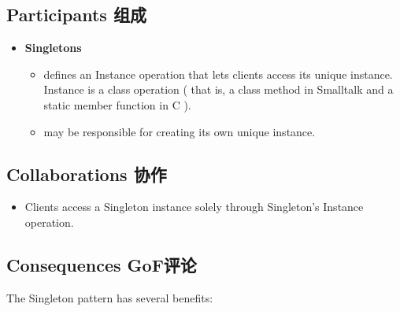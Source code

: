 
\subsection{Participants 组成}

\begin{itemize}
\small
	\item \textbf{Singletons}
	\begin{itemize}
	
		\item defines an Instance operation that lets clients access its unique instance. Instance is a class operation ( that is, a class method in Smalltalk and a static member function in C ).

		\item may be responsible for creating its own unique instance.

	\end{itemize}
\normalize
\end{itemize}

\subsection{Collaborations 协作}

\begin{itemize}

	\item Clients access a Singleton instance solely through Singleton's Instance operation.

\end{itemize}

\subsection{Consequences GoF评论}

The Singleton pattern has several benefits:


